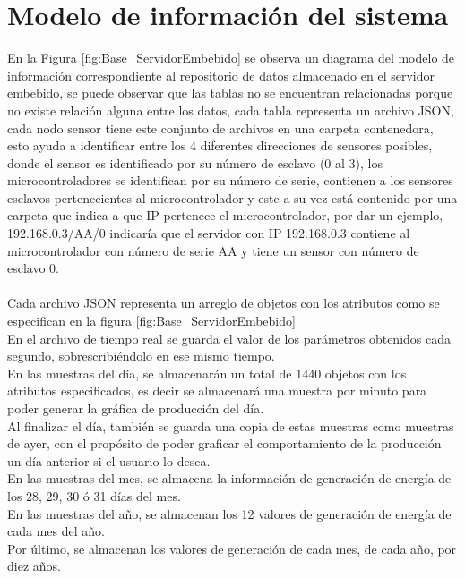 \section{Modelo de información del sistema}
En la Figura \ref{fig:Base_ServidorEmbebido} se observa un diagrama del modelo de información correspondiente al repositorio de datos almacenado en el servidor embebido, se puede observar que las tablas no se encuentran relacionadas porque no existe relación alguna entre los datos, cada tabla representa un archivo JSON, cada nodo sensor tiene este conjunto de archivos en una carpeta contenedora, esto ayuda a identificar entre los 4 diferentes direcciones de sensores posibles, donde el sensor es identificado por su número de esclavo (0 al 3), los microcontroladores se identifican por su número de serie, contienen a los sensores esclavos pertenecientes al microcontrolador y este a su vez está contenido por una carpeta que indica a que IP pertenece el microcontrolador, por dar un ejemplo, 192.168.0.3/AA/0 indicaría que el servidor con IP 192.168.0.3 contiene al microcontrolador con número de serie AA y tiene un sensor con número de esclavo 0. 
\paragraph{}
Cada archivo JSON representa un arreglo de objetos con los atributos como se especifican en la figura \ref{fig:Base_ServidorEmbebido}\\
En el archivo de tiempo real se guarda el valor de los parámetros obtenidos cada segundo, sobrescribiéndolo en ese mismo tiempo.
\\
En las muestras del día, se almacenarán un total de 1440 objetos con los atributos especificados, es decir se almacenará una muestra por minuto para poder generar la gráfica de producción del día.
\\
Al finalizar el día, también se guarda una copia de estas muestras como muestras de ayer, con el propósito de poder graficar el comportamiento de la producción un día anterior si el usuario lo desea.
\\
En las muestras del mes, se almacena la información de generación de energía de los 28, 29, 30 ó 31 días del mes.
\\
En las muestras del año, se almacenan los 12 valores de generación de energía de cada mes del año.
\\
Por último, se  almacenan los valores de generación de cada mes, de cada año, por diez años.

